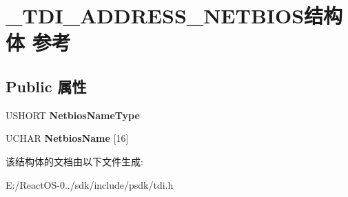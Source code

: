 \hypertarget{struct___t_d_i___a_d_d_r_e_s_s___n_e_t_b_i_o_s}{}\section{\+\_\+\+T\+D\+I\+\_\+\+A\+D\+D\+R\+E\+S\+S\+\_\+\+N\+E\+T\+B\+I\+O\+S结构体 参考}
\label{struct___t_d_i___a_d_d_r_e_s_s___n_e_t_b_i_o_s}
\subsection*{Public 属性}
\begin{DoxyCompactItemize}
\item 
\mbox{\label{struct___t_d_i___a_d_d_r_e_s_s___n_e_t_b_i_o_s_ab1c68b2068627f91d3774ed220a9753e}} 
U\+S\+H\+O\+RT {\bfseries Netbios\+Name\+Type}
\item 
\mbox{\label{struct___t_d_i___a_d_d_r_e_s_s___n_e_t_b_i_o_s_a61f1d8d8b0595c20be2585128ecf6d78}} 
U\+C\+H\+AR {\bfseries Netbios\+Name} \mbox{[}16\mbox{]}
\end{DoxyCompactItemize}


该结构体的文档由以下文件生成\+:\begin{DoxyCompactItemize}
\item 
E\+:/\+React\+O\+S-\/0../sdk/include/psdk/tdi.\+h\end{DoxyCompactItemize}
